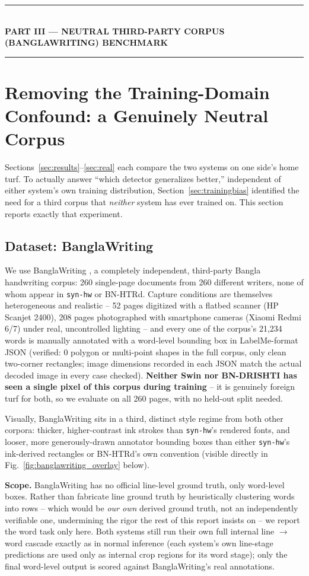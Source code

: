 \documentclass[11pt]{article}
\newcommand{\bnd}{\textbf{BN-DRISHTI}}
\newcommand{\partbanner}[1]{%
\bigskip
\begin{center}
\rule{0.96\linewidth}{1.1pt}\\[5pt]
{\Large\bfseries #1}\\[3pt]
\rule{0.96\linewidth}{1.1pt}
\end{center}
\bigskip
}
\begin{document}
\partbanner{PART III --- NEUTRAL THIRD-PARTY CORPUS (BANGLAWRITING) BENCHMARK}

\section{Removing the Training-Domain Confound: a Genuinely Neutral Corpus}
\label{sec:neutral}

Sections~\ref{sec:results}--\ref{sec:real} each compare the two systems on one side's
home turf. To actually answer ``which detector generalizes better,'' independent of
either system's own training distribution, Section~\ref{sec:trainingbias} identified
the need for a third corpus that \emph{neither} system has ever trained on. This
section reports exactly that experiment.

\subsection{Dataset: BanglaWriting}

We use BanglaWriting \cite{mridha2021banglawriting}, a completely independent,
third-party Bangla handwriting corpus: 260 single-page documents from 260 different
writers, none of whom appear in \texttt{syn-hw} or BN-HTRd. Capture conditions are
themselves heterogeneous and realistic -- 52 pages digitized with a flatbed scanner
(HP Scanjet 2400), 208 pages photographed with smartphone cameras (Xiaomi Redmi 6/7)
under real, uncontrolled lighting -- and every one of the corpus's 21{,}234 words is
manually annotated with a word-level bounding box in LabelMe-format JSON (verified: 0
polygon or multi-point shapes in the full corpus, only clean two-corner rectangles;
image dimensions recorded in each JSON match the actual decoded image in every case
checked). \textbf{Neither Swin nor \bnd{} has seen a single pixel of this corpus during
training} -- it is genuinely foreign turf for both, so we evaluate on all 260 pages,
with no held-out split needed.

Visually, BanglaWriting sits in a third, distinct style regime from both other
corpora: thicker, higher-contrast ink strokes than \texttt{syn-hw}'s rendered fonts,
and looser, more generously-drawn annotator bounding boxes than either
\texttt{syn-hw}'s ink-derived rectangles or BN-HTRd's own convention (visible directly
in Fig.~\ref{fig:banglawriting_overlay} below).

\textbf{Scope.} BanglaWriting has no official line-level ground truth, only word-level
boxes. Rather than fabricate line ground truth by heuristically clustering words into
rows -- which would be \emph{our own} derived ground truth, not an independently
verifiable one, undermining the rigor the rest of this report insists on -- we report
the word task only here. Both systems still run their own full internal line
$\to$ word cascade exactly as in normal inference (each system's own line-stage
predictions are used only as internal crop regions for its word stage); only the final
word-level output is scored against BanglaWriting's real annotations.
\end{document}
